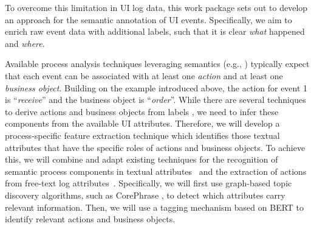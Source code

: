 To overcome this limitation in UI log data, this work package sets out to develop an approach for the semantic annotation of UI events. Specifically, we aim to enrich raw event data with additional labels, such that it is clear \textit{what} happened and \textit{where}. 

 Available process analysis techniques leveraging semantics (e.g., \cite{leopold2012probabilistic,leopold2015_jss,van2021natural}) typically expect that each event can be associated with at least one \textit{action} and at least one \textit{business object}. Building on the example introduced above, the action for event 1 is ``\textit{receive}'' and the business object is ``\textit{order}''. While there are several techniques to derive actions and business objects from labels \cite{leopold2012refactoring,leopold2019using,rebmann2021extracting}, we need to infer these components from the available UI attributes. Therefore, we will develop a process-specific feature extraction technique which identifies those textual attributes that have the specific roles of actions and business objects. To achieve this, we will combine and adapt existing techniques for the recognition of semantic process components in textual attributes~\cite{rebmann2021extracting} and the extraction of actions from free-text log attributes~\cite{gupta2020analyzing}. Specifically, we will first use graph-based topic discovery algorithms, such as CorePhrase \cite{hammouda2005corephrase}, to detect which attributes carry relevant information. Then, we will use a tagging mechanism based on BERT \cite{Devlin2019} to identify relevant actions and business objects. 

